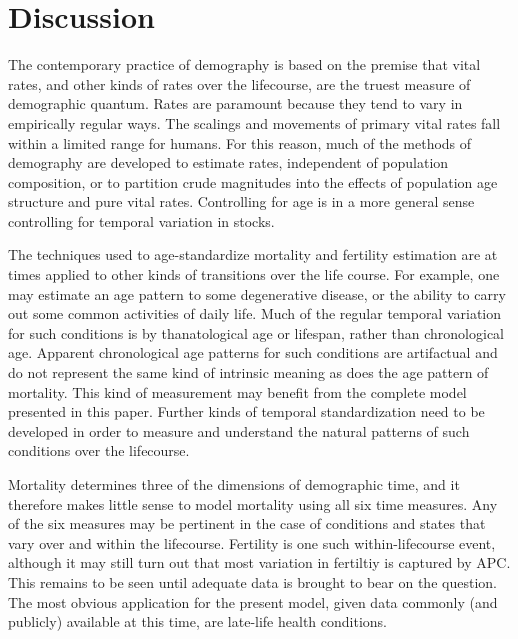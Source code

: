 \documentclass[11pt,oneside,a4paper]{article} %
\begin{document}
\section*{Discussion}
The contemporary practice of demography is based on the premise that vital
rates, and other kinds of rates over the lifecourse, are the truest measure of
demographic quantum. Rates are paramount because they tend to vary in
empirically regular ways. The scalings and movements of primary vital rates fall
within a limited range for humans. For this reason, much of the methods of
demography are developed to estimate rates, independent of population composition, or to
partition crude magnitudes into the effects of population age structure and
pure vital rates. Controlling for age is in a more general sense controlling for
temporal variation in stocks. 

The techniques used to age-standardize mortality and fertility estimation are at
times applied to other kinds of transitions over the life course. For example,
one may estimate an age pattern to some degenerative disease, or the
ability to carry out some common activities of daily life. Much of the
regular temporal variation for such conditions is by thanatological age or
lifespan, rather than chronological age. Apparent chronological age patterns for
such conditions are artifactual and do not represent the same kind of
intrinsic meaning as does the age pattern of mortality. This kind of
measurement may benefit from the complete model presented in this paper. Further
kinds of temporal standardization need to be developed in order to measure and
understand the natural patterns of such conditions over the lifecourse.

Mortality determines three of the dimensions of
demographic time, and it therefore makes little sense to model mortality using
all six time measures. Any of the six measures may be pertinent in the case of
conditions and states that vary over and within the lifecourse. Fertility is one
such within-lifecourse event, although it may still turn out that most
variation in fertiltiy is captured by APC. This remains to be seen until
adequate data is brought to bear on the question. The most obvious application
for the present model, given data commonly (and publicly) available at this
time, are late-life health conditions. 



\FloatBarrier
\end{document}
